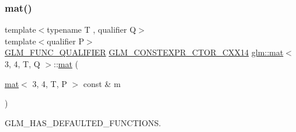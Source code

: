 \mbox{\label{structglm_1_1mat_3_013_00_014_00_01_t_00_01_q_01_4_aa9f1719851a776d4147f74a7883cb577}} 
\subsubsection{\texorpdfstring{mat()}{mat()}\hspace{0.1cm}{\footnotesize\ttfamily [18/21]}}
{\footnotesize\ttfamily template$<$typename T , qualifier Q$>$ \\
template$<$qualifier P$>$ \\
\hyperlink{setup_8hpp_a33fdea6f91c5f834105f7415e2a64407}{G\+L\+M\+\_\+\+F\+U\+N\+C\+\_\+\+Q\+U\+A\+L\+I\+F\+I\+ER} \hyperlink{setup_8hpp_a0900f9145e68bf6061b6f5e7be3fa751}{G\+L\+M\+\_\+\+C\+O\+N\+S\+T\+E\+X\+P\+R\+\_\+\+C\+T\+O\+R\+\_\+\+C\+X\+X14} \hyperlink{structglm_1_1mat}{glm\+::mat}$<$ 3, 4, T, Q $>$\+::\hyperlink{structglm_1_1mat}{mat} (\begin{DoxyParamCaption}\item[{\hyperlink{structglm_1_1mat}{mat}$<$ 3, 4, T, P $>$ const \&}]{m }\end{DoxyParamCaption})}



G\+L\+M\+\_\+\+H\+A\+S\+\_\+\+D\+E\+F\+A\+U\+L\+T\+E\+D\+\_\+\+F\+U\+N\+C\+T\+I\+O\+NS. 

\mbox{\label{structglm_1_1mat_3_013_00_014_00_01_t_00_01_q_01_4_ad1aebdb4ed006b9527f27253b13a54a7}} 
